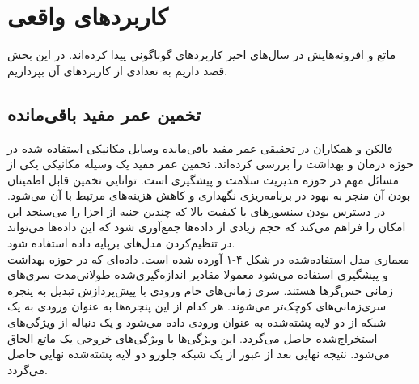 \chapter{کاربردهای واقعی}
ماتع و افزونه‌هایش در سال‌های اخیر کاربردهای گوناگونی پیدا کرده‌اند. در این بخش قصد داریم به تعدادی از کاربردهای آن بپردازیم.

\section{تخمین عمر مفید باقی‌مانده}
فالکن و همکاران\cite{falcon2020neural} در تحقیقی عمر مفید باقی‌مانده وسایل مکانیکی استفاده شده در حوزه درمان و بهداشت را بررسی کرده‌اند. تخمین عمر مفید یک وسیله مکانیکی یکی از مسائل مهم در حوزه مدیریت سلامت و پیشگیری است. توانایی تخمین قابل اطمینان بودن آن منجر به بهود در برنامه‌ریزی نگهداری و کاهش هزینه‌های مرتبط با آن می‌شود. در دسترس بودن سنسورهای با کیفیت بالا که چندین جنبه از اجزا را می‌سنجد این امکان را فراهم می‌کند که حجم زیادی از داده‌ها جمع‌آوری شود که این داده‌ها می‌تواند در تنظیم‌کردن مدل‌های برپایه داده استفاده شود.\cite{falcon2020neural}
\\

معماری مدل استفاده‌شده در شکل ۴-۱ آورده شده است. داده‌ای که در حوزه بهداشت و پیشگیری استفاده می‌شود معمولا مقادیر اندازه‌گیری‌شده طولانی‌مدت سری‌های زمانی حس‌گرها هستند. 
سری زمانی‌های خام ورودی با پیش‌پردازش تبدیل به پنجره سری‌زمانی‌های کوچک‌تر می‌شوند. هر کدام از این پنجره‌ها به عنوان ورودی به یک شبکه از دو لایه پشته‌شده  به عنوان ورودی داده می‌شود و یک دنباله از ویژگی‌های استخراج‌شده حاصل می‌گردد. این ویژگی‌ها با ویژگی‌های خروجی یک ماتع الحاق می‌شود. نتیجه نهایی بعد از عبور از یک شبکه جلورو دو لایه پشته‌شده نهایی حاصل می‌گردد.\cite{falcon2020neural}
\\

